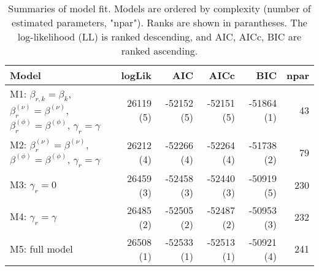 \begin{table}[ht]
\centering
\begingroup\fontsize{9pt}{10pt}\selectfont
\begin{tabular}{l|rrrrr}
  \hline
Model & logLik & AIC & AICc & BIC & npar \\ 
  \hline
M1: $\beta_{r,k} = \beta_{k}$, $\beta_{r}^{(\nu)} = \beta^{(\nu)}$, $\beta_{r}^{(\phi)} = \beta^{(\phi)}$, $\gamma_r = \gamma$ & 26119 (5) & -52152 (5) & -52151 (5) & -51864 (1) & 43 \\ 
  M2: $\beta_{r}^{(\nu)} = \beta^{(\nu)}$, $\beta^{(\phi)} = \beta^{(\phi)}$, $\gamma_r = \gamma$ & 26212 (4) & -52266 (4) & -52264 (4) & -51738 (2) & 79 \\ 
  M3: $\gamma_r = 0$ & 26459 (3) & -52458 (3) & -52440 (3) & -50919 (5) & 230 \\ 
  M4: $\gamma_r = \gamma$ & 26485 (2) & -52505 (2) & -52487 (2) & -50953 (3) & 232 \\ 
  M5: full model & 26508 (1) & -52533 (1) & -52513 (1) & -50921 (4) & 241 \\ 
   \hline
\end{tabular}
\endgroup
\caption{Summaries of model fit.
             Models are ordered by complexity (number of estimated parameters, "npar").
             Ranks are shown in parantheses.
             The log-likelihood (LL) is ranked descending,
             and AIC, AICc, BIC are ranked ascending.} 
\label{tab:mBetafit}
\end{table}
